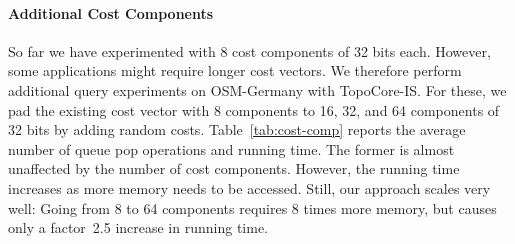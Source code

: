 \documentclass{sig-alternate}
\begin{document}
\paragraph{Additional Cost Components}

So far we have experimented with 8 cost components of 32 bits each.
However, some applications might require longer cost vectors.
We therefore perform additional query experiments on OSM-Germany with TopoCore-IS.
For these, we pad the existing cost vector with 8 components to 16, 32, and 64 components of 32 bits by adding random costs.
Table~\ref{tab:cost-comp} reports the average number of queue pop operations and running time.
The former is almost unaffected by the number of cost components.
However, the running time increases as more memory needs to be accessed.
Still, our approach scales very well: Going from 8 to 64 components requires 8 times more memory, but causes only a factor~2.5 increase in running time.
\end{document}
